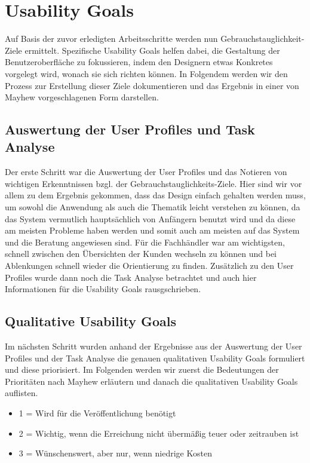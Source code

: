 \chapter{Usability Goals}\label{usabilityGoals}

Auf Basis der zuvor erledigten Arbeitsschritte werden nun Gebrauchstauglichkeit-Ziele ermittelt. Spezifische Usability Goals helfen dabei, die Gestaltung der Benutzeroberfläche zu fokussieren, indem den Designern etwas Konkretes vorgelegt wird, wonach sie sich richten können. In Folgendem werden wir den Prozess zur Erstellung dieser Ziele dokumentieren und das Ergebnis in einer von Mayhew vorgeschlagenen Form darstellen.

\section{Auswertung der User Profiles und Task Analyse}

Der erste Schritt war die Auswertung der User Profiles und das Notieren von wichtigen Erkenntnissen bzgl. der Gebrauchstauglichkeits-Ziele. Hier sind wir vor allem zu dem Ergebnis gekommen, dass das Design einfach gehalten werden muss, um sowohl die Anwendung als auch die Thematik leicht verstehen zu können, da das System vermutlich hauptsächlich von Anfängern benutzt wird und da diese am meisten Probleme haben werden und somit auch am meisten auf das System und die Beratung angewiesen sind. Für die Fachhändler war am wichtigsten, schnell zwischen den Übersichten der Kunden wechseln zu können und bei Ablenkungen schnell wieder die Orientierung zu finden. Zusätzlich zu den User Profiles wurde dann noch die Task Analyse betrachtet und auch hier Informationen für die Usability Goals rausgschrieben.

\section{Qualitative Usability Goals}

Im nächsten Schritt wurden anhand der Ergebnisse aus der Auswertung der User Profiles und der Task Analyse die genauen qualitativen Usability Goals formuliert und diese priorisiert. Im Folgenden werden wir zuerst die Bedeutungen der Prioritäten nach Mayhew erläutern und danach die qualitativen Usability Goals auflisten.

\begin{itemize}
  \item 1 = Wird für die Veröffentlichung benötigt
  \item 2 = Wichtig, wenn die Erreichung nicht übermäßig teuer oder zeitrauben ist
  \item 3 = Wünschenswert, aber nur, wenn niedrige Kosten
\end{itemize}	

